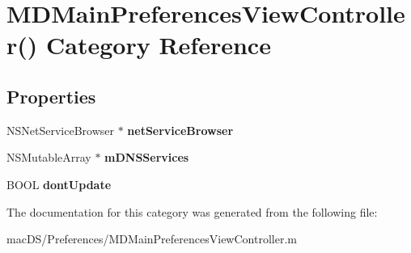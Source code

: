 \hypertarget{category_m_d_main_preferences_view_controller_07_08}{\section{M\-D\-Main\-Preferences\-View\-Controller() Category Reference}
\label{category_m_d_main_preferences_view_controller_07_08}
}
\subsection*{Properties}
\begin{DoxyCompactItemize}
\item 
\hypertarget{category_m_d_main_preferences_view_controller_07_08_a2f0396ccdf297bbcc5acf103adc9d3af}{N\-S\-Net\-Service\-Browser $\ast$ {\bfseries net\-Service\-Browser}}\label{category_m_d_main_preferences_view_controller_07_08_a2f0396ccdf297bbcc5acf103adc9d3af}

\item 
\hypertarget{category_m_d_main_preferences_view_controller_07_08_a551876c6bb60b90b3ece86926bf4eef7}{N\-S\-Mutable\-Array $\ast$ {\bfseries m\-D\-N\-S\-Services}}\label{category_m_d_main_preferences_view_controller_07_08_a551876c6bb60b90b3ece86926bf4eef7}

\item 
\hypertarget{category_m_d_main_preferences_view_controller_07_08_a1e3c892d4ae74339fff7e2a90702e4ac}{B\-O\-O\-L {\bfseries dont\-Update}}\label{category_m_d_main_preferences_view_controller_07_08_a1e3c892d4ae74339fff7e2a90702e4ac}

\end{DoxyCompactItemize}


The documentation for this category was generated from the following file\-:\begin{DoxyCompactItemize}
\item 
mac\-D\-S/\-Preferences/M\-D\-Main\-Preferences\-View\-Controller.\-m\end{DoxyCompactItemize}
